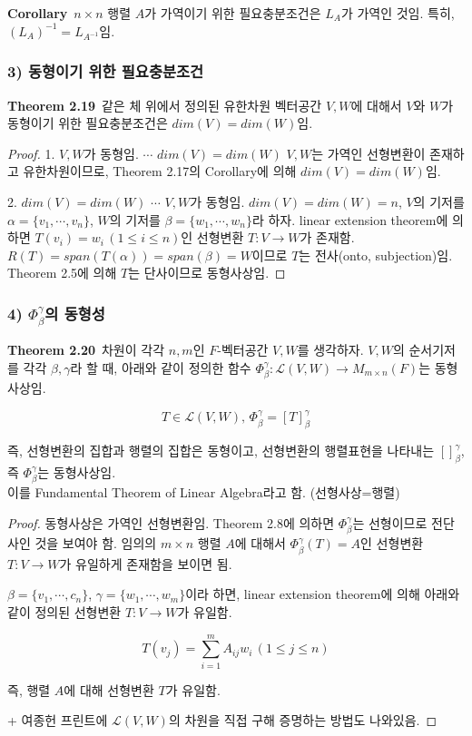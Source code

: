 \textbf{Corollary}\, $n \times n$ 행렬 $A$가 가역이기 위한 필요충분조건은 $L_A$가 가역인 것임. 특히, $(L_A)^{-1}=L_{A^{-1}}$임.

\subsubsection*{3) 동형이기 위한 필요충분조건}
\textbf{Theorem 2.19}\, 같은 체 위에서 정의된 유한차원 벡터공간 $V,W$에 대해서 $V$와 $W$가 동형이기 위한 필요충분조건은 $dim(V)=dim(W)$임.

\begin{proof}
1. $V,W$가 동형임. $\cdots$ $dim(V)=dim(W)$
$V,W$는 가역인 선형변환이 존재하고 유한차원이므로, Theorem 2.17의 Corollary에 의해 $dim(V)=dim(W)$임.

2. $dim(V)=dim(W)$ $\cdots$ $V,W$가 동형임.
$dim(V)=dim(W)=n$, $V$의 기저를 $\alpha=\{v_1, \cdots ,v_n\}$, $W$의 기저를 $\beta=\{w_1, \cdots ,w_n\}$라 하자. linear extension theorem에 의하면 $T(v_i)=w_i\,(1 \leq i \leq n)$인 선형변환 $T:V \rightarrow W$가 존재함. $R(T)=span(T(\alpha))=span(\beta)=W$이므로 $T$는 전사(onto, subjection)임. Theorem 2.5에 의해 $T$는 단사이므로 동형사상임.
\end{proof}


\newpage


\subsubsection*{4) $\Phi^{\gamma}_{\beta}$의 동형성}
\textbf{Theorem 2.20}\, 차원이 각각 $n,m$인 $F$-벡터공간 $V,W$를 생각하자. $V,W$의 순서기저를 각각 $\beta,\gamma$라 할 때, 아래와 같이 정의한 함수 $\Phi^{\gamma}_{\beta}:\mathcal{L}(V,W) \rightarrow M_{m \times n}(F)$는 동형사상임.

\[
T \in \mathcal{L}(V,W),\,\Phi^{\gamma}_{\beta}=[T]^{\gamma}_{\beta}
\]

즉, 선형변환의 집합과 행렬의 집합은 동형이고, 선형변환의 행렬표현을 나타내는 $[]_{\beta}^{\gamma}$, 즉 $\Phi^{\gamma}_{\beta}$는 동형사상임.\\
이를 Fundamental Theorem of Linear Algebra라고 함. (선형사상=행렬)

\begin{proof}
동형사상은 가역인 선형변환임. Theorem 2.8에 의하면 $\Phi^{\gamma}_{\beta}$는 선형이므로 전단사인 것을 보여야 함. 임의의 $m \times n$ 행렬 $A$에 대해서 $\Phi^{\gamma}_{\beta}(T)=A$인 선형변환 $T:V \rightarrow W$가 유일하게 존재함을 보이면 됨.

$\beta=\{v_1, \cdots ,c_n\}$, $\gamma=\{w_1, \cdots ,w_m\}$이라 하면, linear extension theorem에 의해 아래와 같이 정의된 선형변환 $T:V \rightarrow W$가 유일함.

\[
T(v_j)=\sum_{i=1}^{m}A_{ij}w_i\,(1 \leq j \leq n)
\]

즉, 행렬 $A$에 대해 선형변환 $T$가 유일함.

+ 여종헌 프린트에 $\mathcal{L}(V,W)$의 차원을 직접 구해 증명하는 방법도 나와있음.
\end{proof}

